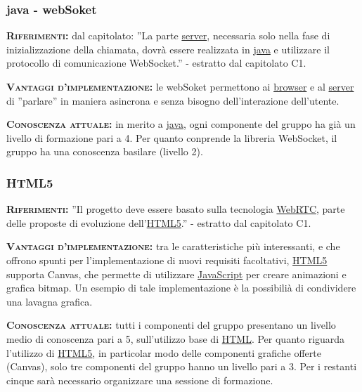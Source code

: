 \subsubsection{java - webSoket}
\begin{description}
	\item{\scshape\bfseries Riferimenti:} dal capitolato: ''La parte \underline{server}, necessaria solo nella fase di inizializzazione della chiamata, dovrà essere realizzata in \underline{java} e utilizzare il protocollo di comunicazione WebSocket.'' - estratto dal capitolato C1.
	
	\item{\scshape\bfseries Vantaggi d'implementazione:} le webSoket permettono ai \underline{browser} e al \underline{server} di ''parlare'' in maniera asincrona e senza bisogno dell'interazione dell'utente.

	\item{\scshape\bfseries Conoscenza attuale:} in merito a \underline{java}, ogni componente del gruppo ha già un livello di formazione pari a 4. Per quanto conprende la libreria  WebSocket, il gruppo ha una conoscenza basilare (livello 2).  
\end{description}

\subsubsection{HTML5}
\begin{description}
	\item{\scshape\bfseries Riferimenti:} ''Il progetto deve essere basato sulla tecnologia \underline{WebRTC}, parte delle proposte di evoluzione dell'\underline{HTML5}.'' - estratto dal capitolato C1.
	
	\item{\scshape\bfseries Vantaggi d'implementazione:} tra le caratteristiche più interessanti, e che offrono spunti per l'implementazione di nuovi requisiti facoltativi, \underline{HTML5} supporta Canvas, che permette di utilizzare \underline{JavaScript} per creare animazioni e grafica bitmap. Un esempio di tale implementazione è la possibilià di condividere una lavagna grafica.
	
	\item{\scshape\bfseries Conoscenza attuale:} tutti i componenti del gruppo presentano un livello medio di conoscenza pari a 5, sull'utilizzo base di \underline{HTML}. Per quanto riguarda l'utilizzo di \underline{HTML5}, in particolar modo delle componenti grafiche offerte (Canvas), solo tre componenti del gruppo hanno un livello pari a 3. Per i restanti cinque sarà necessario organizzare una sessione di formazione.
\end{description}

